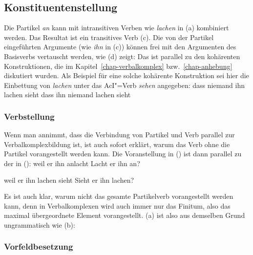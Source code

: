 \subsection{Konstituentenstellung}
\label{sec-linearization}%
\label{sec-partlinearization}
\label{sec-linearization-pv-mf}


Die Partikel \emph{an} kann mit intransitiven Verben
wie \emph{lachen} in (a) kombiniert werden. Das Resultat ist ein transitives Verb (c).
Die von der Partikel eingeführten Argumente (wie \zb \emph{ihn} in (c)) können frei
mit den Argumenten des Basisverbs vertauscht werden, wie (d) zeigt:
\eal
\label{ex-anlachen-perm-mf}
\zl
Das ist parallel zu den kohärenten Konstruktionen, die im Kapitel~\ref{chap-verbalkomplex}
bzw.~\ref{chap-anhebung} diskutiert wurden. Als Beispiel für eine solche kohärente Konstruktion
sei hier die Einbettung von \emph{lachen} unter das AcI"=Verb \emph{sehen} angegeben:
\eal
\ex dass niemand ihn lachen sieht
\ex dass ihn niemand lachen sieht
\zl


\subsubsection{Verbstellung}

Wenn man annimmt, dass die Verbindung von Partikel und Verb parallel zur Verbalkomplexbildung 
ist, ist auch sofort erklärt, warum das Verb ohne die Partikel vorangestellt werden kann. Die Voranstellung
in () ist dann parallel zu der in ():
\eal
\ex weil er ihn anlacht
\ex Lacht er ihn an?
\zl

\eal
\ex weil er ihn lachen sieht
\ex Sieht er ihn lachen?
\zl

\noindent
Es ist auch klar, warum nicht das gesamte Partikelverb vorangestellt werden kann,
denn in Verbalkomplexen wird auch immer nur das Finitum, also das maximal übergeordnete
Element vorangestellt. (a) ist also aus demselben Grund ungrammatisch wie (b):
\eal
{}
\zl

\subsubsection{Vorfeldbesetzung}
\label{sec-part-vorfeldbesetzung}

